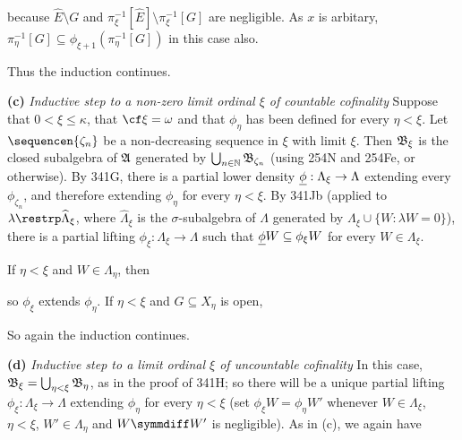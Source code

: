 { 
      
\noindent because $\hat E\setminus G$ and  
$\pi_{\xi}^{-1}[\hat E]\setminus\pi_{\xi}^{-1}[G]$ are negligible.   As $x$ is arbitary,  
$\pi^{-1}_{\eta}[G]\subseteq\phi_{\xi+1}(\pi^{-1}_{\eta}[G])$ in this case also. 
      
Thus the induction continues. 
      
\medskip 
      
{\bf (c)} {\it Inductive step to a non-zero limit ordinal $\xi$ of 
countable cofinality} Suppose that $0<\xi\le\kappa$, that 
$\cf\xi=\omega$ and that $\phi_{\eta}$ has been defined for every 
$\eta<\xi$.   Let $\sequencen{\zeta_n}$ be a non-decreasing sequence in 
$\xi$ with limit $\xi$.   Then $\frak B_{\xi}$ is the closed subalgebra 
of $\frak A$ generated by $\bigcup_{n\in\Bbb N}\frak B_{\zeta_n}$ (using 
254N and 254Fe, or otherwise).   By 341G, there is a partial lower 
density $\underline{\phi}:\Lambda_{\xi}\to\Lambda$ extending every 
$\phi_{\zeta_n}$, and 
therefore extending $\phi_{\eta}$ for every $\eta<\xi$.   By 341Jb 
(applied to $\lambda\restrp\widehat{\Lambda}_{\xi}$, where 
$\widehat{\Lambda}_{\xi}$ is the $\sigma$-subalgebra of $\Lambda$ 
generated by $\Lambda_{\xi}\cup\{W:\lambda W=0\}$), there is a partial 
lifting $\phi_{\xi}:\Lambda_{\xi}\to\Lambda$ such that 
$\underline{\phi} W\subseteq\phi_{\xi}W$ for every $W\in\Lambda_{\xi}$. 
      
If $\eta<\xi$ and $W\in\Lambda_{\eta}$, then 
      
      
\noindent so $\phi_{\xi}$ extends $\phi_{\eta}$.   If $\eta<\xi$ and $G\subseteq X_{\eta}$ is open, 
      
      
\noindent So again the induction continues. 
      
\medskip 
      
{\bf (d)} {\it Inductive step to a limit ordinal $\xi$ of uncountable 
cofinality} In this case, 
$\frak B_{\xi}=\bigcup_{\eta<\xi}\frak B_{\eta}$, as in the proof of 
341H;  so there will be a unique 
partial lifting $\phi_{\xi}:\Lambda_{\xi}\to\Lambda$ extending 
$\phi_{\eta}$ for every $\eta<\xi$ (set $\phi_{\xi}W=\phi_{\eta}W'$ 
whenever $W\in\Lambda_{\xi}$, $\eta<\xi$, $W'\in\Lambda_{\eta}$ and 
$W\symmdiff W'$ is negligible).   As in (c), we again have 
      
}
